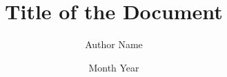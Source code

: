 \documentclass[phd,thesis,twoside]{iist}
\title{Title of the Document}
\author{Author Name}
\date{Month Year}
\begin{document}
\maketitle %
\makecertificate %
\makedeclaration %
\makededication %
\makeacknowledgements %
\makeabstract %
\maketableofcontents %
\makelistoffigures %
\makelistoftables %
\makelistofalgorithms %
\makeabbreviations %
\makenomenclature %

\makechaptersettings 







\makebibsettings



\makepublications

\makeappendixsettings



\makeindexsettings
\end{document}
